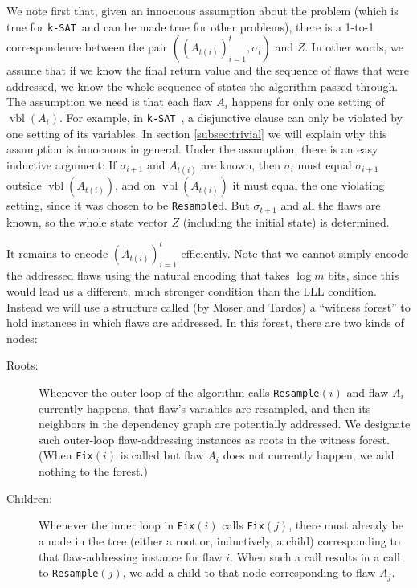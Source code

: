 \documentclass[twocolumn]{article}
\newcommand{\ksat}{\texttt{k-SAT}~}
\begin{document}
We note first that, given an innocuous assumption about the problem (which is true for \ksat and can be made true for other problems), there is a 1-to-1 correspondence between the pair $((A_{t(i)})_{i=1}^{t}, \sigma_{t})$ and $Z$.  In other words, we assume that if we know the final return value and the sequence of flaws that were addressed, we know the whole sequence of states the algorithm passed through.  The assumption we need is that each flaw $A_i$ happens for only one setting of $\operatorname{vbl}(A_i)$.  For example, in \ksat, a disjunctive clause can only be violated by one setting of its variables.  In section \ref{subsec:trivial} we will explain why this assumption is innocuous in general.  Under the assumption, there is an easy inductive argument: If $\sigma_{i+1}$ and $A_{t(i)}$ are known, then $\sigma_i$ must equal $\sigma_{i+1}$ outside $\operatorname{vbl}(A_{t(i)})$, and on $\operatorname{vbl}(A_{t(i)})$ it must equal the one violating setting, since it was chosen to be \texttt{Resample}d.  But $\sigma_{t+1}$ and all the flaws are known, so the whole state vector $Z$ (including the initial state) is determined.

It remains to encode $(A_{t(i)})_{i=1}^{t}$ efficiently.  Note that we cannot simply encode the addressed flaws using the natural encoding that takes $\log m$ bits, since this would lead us a different, much stronger condition than the LLL condition.  Instead we will use a structure called (by Moser and Tardos) a ``witness forest'' to hold instances in which flaws are addressed.  In this forest, there are two kinds of nodes:
\begin{description}
  \item[Roots:] Whenever the outer loop of the algorithm calls \texttt{Resample}$(i)$ and flaw $A_i$ currently happens, that flaw's variables are resampled, and then its neighbors in the dependency graph are potentially addressed.  We designate such outer-loop flaw-addressing instances as roots in the witness forest.  (When \texttt{Fix}$(i)$ is called but flaw $A_i$ does not currently happen, we add nothing to the forest.)
  \item[Children:] Whenever the inner loop in \texttt{Fix}$(i)$ calls \texttt{Fix}$(j)$, there must already be a node in the tree (either a root or, inductively, a child) corresponding to that flaw-addressing instance for flaw $i$.  When such a call results in a call to \texttt{Resample}$(j)$, we add a child to that node corresponding to flaw $A_j$.
\end{description}
\end{document}
